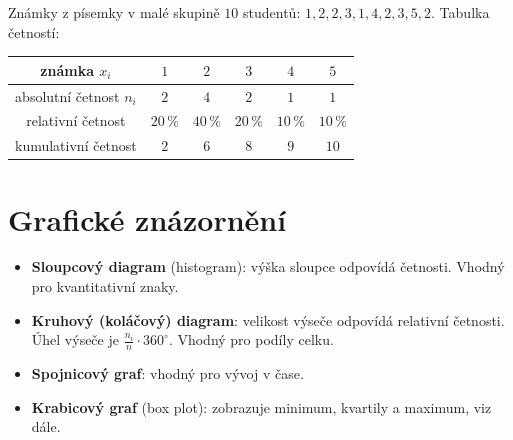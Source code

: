 \begin{example}\label{ex:znamky}
  Známky z písemky v malé skupině $10$ studentů: $1, 2, 2, 3, 1, 4, 2, 3, 5, 2$. Tabulka četností:
  \begin{center}
    \renewcommand{\arraystretch}{1.3}
    \begin{tabular}{|c|c|c|c|c|c|}
      \hline
      známka $x_i$ & $1$ & $2$ & $3$ & $4$ & $5$ \\
      \hline
      absolutní četnost $n_i$ & $2$ & $4$ & $2$ & $1$ & $1$ \\
      relativní četnost & $20\,\%$ & $40\,\%$ & $20\,\%$ & $10\,\%$ & $10\,\%$ \\
      kumulativní četnost & $2$ & $6$ & $8$ & $9$ & $10$ \\
      \hline
    \end{tabular}
  \end{center}
\end{example}

\section{Grafické znázornění}\label{sec:graficke-znazorneni}

\begin{definitionbox}
  \begin{itemize}
    \item \textbf{Sloupcový diagram} (histogram): výška sloupce odpovídá četnosti. Vhodný pro kvantitativní znaky.
    \item \textbf{Kruhový (koláčový) diagram}: velikost výseče odpovídá relativní četnosti. Úhel výseče je $\frac{n_i}{n}\cdot 360^\circ$. Vhodný pro podíly celku.
    \item \textbf{Spojnicový graf}: vhodný pro vývoj v čase.
    \item \textbf{Krabicový graf} (box plot): zobrazuje minimum, kvartily a maximum, viz dále.
  \end{itemize}
\end{definitionbox}


